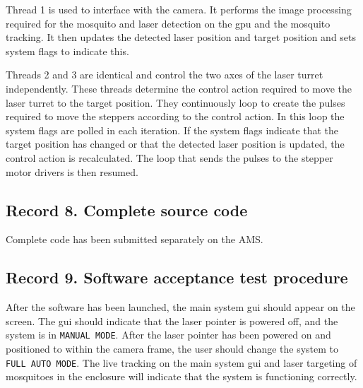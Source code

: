 Thread 1 is used to interface with the camera. It performs the image processing required for the mosquito and laser detection on the \gls{gpu} and the mosquito tracking. It then updates the detected laser position and target position and sets system flags to indicate this.

Threads 2 and 3 are identical and control the two axes of the laser turret independently. These threads determine the control action required to move the laser turret to the target position. They continuously loop to create the pulses required to move the steppers according to the control action. In this loop the system flags are polled in each iteration. If the system flags indicate that the target position has changed or that the detected laser position is updated, the control action is recalculated. The loop that sends the pulses to the stepper motor drivers is then resumed.

\newpage
\subsection{Record 8. Complete source code}
Complete code has been submitted separately on the AMS.

\newpage
\subsection{Record 9. Software acceptance test procedure}
After the software has been launched, the main system \gls{gui} should appear on the screen. The \gls{gui} should indicate that the laser pointer is powered off, and the system is in \texttt{MANUAL MODE}. After the laser pointer has been powered on and positioned to within the camera frame, the user should change the system to \texttt{FULL AUTO MODE}. The live tracking on the main system \gls{gui} and laser targeting of mosquitoes in the enclosure will indicate that the system is functioning correctly.

\newpage
